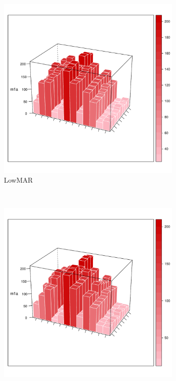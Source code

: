 \documentclass{article}
\begin{document}
		\clearpage
		
	\begin{figure}
		\centering
		\begin{subfigure}[b]{0.45\textwidth}
			\includegraphics[width=\textwidth]{Low/MAR.pdf}
			\caption{LowMAR}
			\label{fig:LowMAR}
		\end{subfigure}
		~ %
		\begin{subfigure}[b]{0.45\textwidth}
			\includegraphics[width=\textwidth]{Low/MIV.pdf}

\end{subfigure}
\end{figure}
\end{document}
